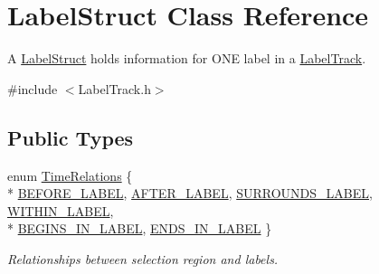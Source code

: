 \hypertarget{class_label_struct}{}\section{Label\+Struct Class Reference}
\label{class_label_struct}


A \hyperlink{class_label_struct}{Label\+Struct} holds information for O\+NE label in a \hyperlink{class_label_track}{Label\+Track}.  




{\ttfamily \#include $<$Label\+Track.\+h$>$}

\subsection*{Public Types}
\begin{DoxyCompactItemize}
\item 
enum \hyperlink{class_label_struct_a3e70ad31acce8270b0796c9e46bbdfe8}{Time\+Relations} \{ \\*
\hyperlink{class_label_struct_a3e70ad31acce8270b0796c9e46bbdfe8aacd7a2485255437d0be6a8ad50d1a0cf}{B\+E\+F\+O\+R\+E\+\_\+\+L\+A\+B\+EL}, 
\hyperlink{class_label_struct_a3e70ad31acce8270b0796c9e46bbdfe8ac8591413369ee4df74d0e2472952254e}{A\+F\+T\+E\+R\+\_\+\+L\+A\+B\+EL}, 
\hyperlink{class_label_struct_a3e70ad31acce8270b0796c9e46bbdfe8a7d2eb849dac366b9e3f59933e643b3fe}{S\+U\+R\+R\+O\+U\+N\+D\+S\+\_\+\+L\+A\+B\+EL}, 
\hyperlink{class_label_struct_a3e70ad31acce8270b0796c9e46bbdfe8a3cfb7877ad14a3006551b7a0c503e242}{W\+I\+T\+H\+I\+N\+\_\+\+L\+A\+B\+EL}, 
\\*
\hyperlink{class_label_struct_a3e70ad31acce8270b0796c9e46bbdfe8a5546f41def946d8ff28f8cedbcd17945}{B\+E\+G\+I\+N\+S\+\_\+\+I\+N\+\_\+\+L\+A\+B\+EL}, 
\hyperlink{class_label_struct_a3e70ad31acce8270b0796c9e46bbdfe8a955b9201235ae459ac0e0c2613dd396d}{E\+N\+D\+S\+\_\+\+I\+N\+\_\+\+L\+A\+B\+EL}
 \}\begin{DoxyCompactList}\small\item\em Relationships between selection region and labels. \end{DoxyCompactList}
\end{DoxyCompactItemize}
